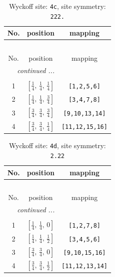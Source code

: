 \documentclass[fleqn,8pt]{jsarticle}
\begin{document}
\renewcommand{\arraystretch}{1.2}
\begin{longtable}{ccc}
\caption{Wyckoff site: {\tt 4c}, site symmetry: {\tt 222.}}
 \\
 \hline \hline
No. & position & mapping \\ \hline \endfirsthead

\multicolumn{2}{l}{\tablename\ \thetable{}} \\
 \hline \hline
No. & position & mapping \\ \hline \endhead

 \hline \hline
\multicolumn{2}{r}{\footnotesize\it continued ...} \\ \endfoot

 \hline \hline
\multicolumn{2}{r}{} \\ \endlastfoot

1 & $\left[ \frac{1}{4},\, \frac{1}{4},\, \frac{1}{4} \right]$ & {\tt [1,2,5,6]} \\ \hline
2 & $\left[ \frac{1}{4},\, \frac{1}{4},\, \frac{3}{4} \right]$ & {\tt [3,4,7,8]} \\ \hline
3 & $\left[ \frac{3}{4},\, \frac{3}{4},\, \frac{3}{4} \right]$ & {\tt [9,10,13,14]} \\ \hline
4 & $\left[ \frac{3}{4},\, \frac{3}{4},\, \frac{1}{4} \right]$ & {\tt [11,12,15,16]} \\
\end{longtable}
\renewcommand{\arraystretch}{1.2}
\begin{longtable}{ccc}
\caption{Wyckoff site: {\tt 4d}, site symmetry: {\tt 2.22}}
 \\
 \hline \hline
No. & position & mapping \\ \hline \endfirsthead

\multicolumn{2}{l}{\tablename\ \thetable{}} \\
 \hline \hline
No. & position & mapping \\ \hline \endhead

 \hline \hline
\multicolumn{2}{r}{\footnotesize\it continued ...} \\ \endfoot

 \hline \hline
\multicolumn{2}{r}{} \\ \endlastfoot

1 & $\left[ \frac{1}{4},\, \frac{1}{4},\, 0 \right]$ & {\tt [1,2,7,8]} \\ \hline
2 & $\left[ \frac{1}{4},\, \frac{1}{4},\, \frac{1}{2} \right]$ & {\tt [3,4,5,6]} \\ \hline
3 & $\left[ \frac{3}{4},\, \frac{3}{4},\, 0 \right]$ & {\tt [9,10,15,16]} \\ \hline
4 & $\left[ \frac{3}{4},\, \frac{3}{4},\, \frac{1}{2} \right]$ & {\tt [11,12,13,14]} \\
\end{longtable}
\end{document}
